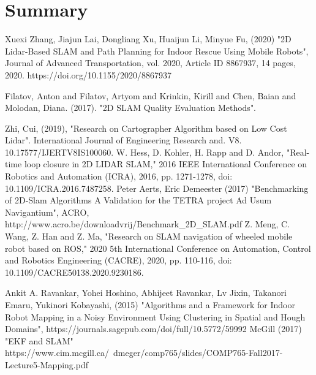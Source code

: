 \documentclass[12pt, a4paper, onecolumn]{article}
\begin{document}
\section{Summary}
\newpage
\begin{thebibliography}{9}
Xuexi Zhang, Jiajun Lai, Dongliang Xu, Huaijun Li, Minyue Fu, (2020) "2D Lidar-Based SLAM and Path Planning for Indoor Rescue Using Mobile Robots", Journal of Advanced Transportation, vol. 2020, Article ID 8867937, 14 pages, 2020. https://doi.org/10.1155/2020/8867937

Filatov, Anton and Filatov, Artyom and Krinkin, Kirill and Chen, Baian and Molodan, Diana. (2017). "2D SLAM Quality Evaluation Methods". 

Zhi, Cui, (2019), "Research on Cartographer Algorithm based on Low Cost Lidar". International Journal of Engineering Research and. V8. 10.17577/IJERTV8IS100060. 
W. Hess, D. Kohler, H. Rapp and D. Andor, "Real-time loop closure in 2D LIDAR SLAM," 2016 IEEE International Conference on Robotics and Automation (ICRA), 2016, pp. 1271-1278, doi: 10.1109/ICRA.2016.7487258.
Peter Aerts, Eric Demeester (2017) "Benchmarking of 2D-Slam Algorithms
A Validation for the TETRA project Ad Usum Navigantium", ACRO, http://www.acro.be/downloadvrij/Benchmark{\_}2D{\_}SLAM.pdf
Z. Meng, C. Wang, Z. Han and Z. Ma, "Research on SLAM navigation of wheeled mobile robot based on ROS," 2020 5th International Conference on Automation, Control and Robotics Engineering (CACRE), 2020, pp. 110-116, doi: 10.1109/CACRE50138.2020.9230186.

  Ankit A. Ravankar, Yohei Hoshino, Abhijeet Ravankar, Lv Jixin, Takanori Emaru, Yukinori Kobayashi, (2015) "Algorithms and a Framework for Indoor Robot Mapping in a Noisy Environment Using Clustering in Spatial and Hough Domains", https://journals.sagepub.com/doi/full/10.5772/59992
  McGill (2017) "EKF and SLAM" https://www.cim.mcgill.ca/~dmeger/comp765/slides/COMP765-Fall2017-Lecture5-Mapping.pdf
\end{thebibliography}
\end{document}
